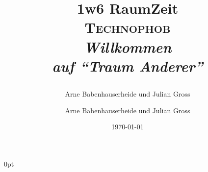 \usepackage[utf8]{inputenc}
\usepackage[T1]{fontenc}
\usepackage{fixltx2e}
\usepackage{graphicx}
\usepackage{longtable}
\usepackage{float}
\usepackage{wrapfig}
\usepackage{rotating}
\usepackage[normalem]{ulem}
\usepackage{amsmath}
\usepackage{textcomp}
\usepackage{marvosym}
\usepackage{wasysym}
\usepackage{amssymb}
\usepackage{hyperref}
\usepackage{color}
\usepackage{minted}
\usepackage{parskip}
\usepackage{layout}
\usepackage{lipsum}
\usepackage[T1]{fontenc}
\usepackage[ngerman, germanb]{babel}
\usepackage{wallpaper}

\setcounter{secnumdepth}{0}

\setlrmarginsandblock{10mm}{50mm}{*}
\footnotesinmargin
\renewcommand{\footnote}{\sidefootnote}
\checkandfixthelayout
\setlength{\sidefootwidth}{\marginparwidth}
\setsidebars{\marginparsep}{\marginparwidth}{\onelineskip}%
            {0pt}{\normalsize\normalfont}{\textheight}


\setlength{\droptitle}{-1.82cm}
\renewcommand{\maketitlehooka}{\ThisLLCornerWallPaper{1}{logo-cover}}
\renewcommand{\maketitlehookb}{\newpage} %
\pretitle{\begin{center}\Large}
\posttitle{\end{center}}
\author{Arne Babenhauserheide und Julian Gross}
\author{Arne Babenhauserheide und Julian Gross}
\date{\today}
\title{\raggedright \hspace{0.5cm} 1w6 RaumZeit \\ \centering \vspace{0.4cm} \vspace{1.50cm} \hspace{0.5cm} \HUGE \textsc{\bfseries Technophob}\LARGE \\ \vspace{0.3cm} \hspace{0.5cm} \itshape Willkommen \\ \hspace{0.5cm} auf ``Traum Anderer'' \\
}

